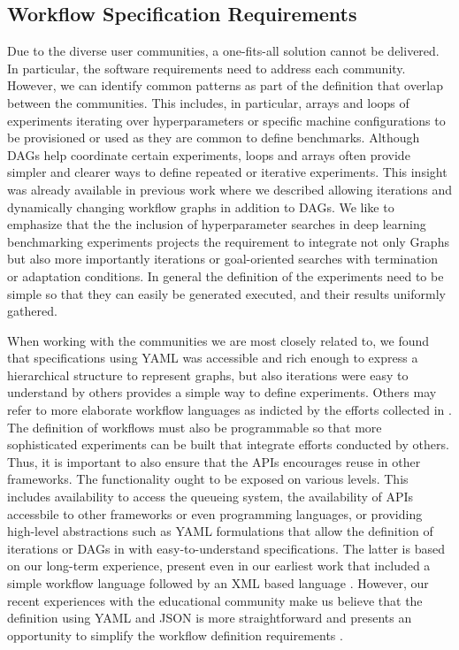 \documentclass[sigconf]{acmart}
\begin{document}
\subsection{Workflow Specification Requirements}
\label{sec:definition}

Due to the diverse user communities, a one-fits-all solution cannot be delivered. In particular, the software requirements need to address each community. However, we can identify common patterns as part of the definition that overlap between the communities. This includes, in particular, arrays and loops of experiments iterating over hyperparameters or specific machine configurations to be provisioned or used as they are common to define benchmarks. Although DAGs help coordinate certain experiments, loops and arrays often provide simpler and clearer ways to define repeated or iterative experiments. This insight was already available in previous work where we described allowing iterations and dynamically changing workflow graphs \citep{las07-workflow} in addition to DAGs. We like to emphasize that the the inclusion of hyperparameter searches in deep learning benchmarking experiments projects the requirement to integrate not only Graphs but also more importantly iterations or goal-oriented searches with termination or adaptation conditions. 
In general the definition of the experiments need to be simple so that they can easily be generated executed, and their results uniformly gathered. 

When working with the communities we are most closely related to, we found that specifications using YAML was accessible and rich enough to express a hierarchical structure to represent graphs, but also iterations were easy to understand by others provides a simple way to define experiments. Others may refer to more elaborate workflow languages as indicted by the efforts collected in \citep{workflow-list}. The definition of workflows must also be programmable so that more sophisticated experiments can be built that integrate efforts conducted by others. Thus, it is important to also ensure that the APIs encourages reuse in other frameworks. The functionality ought to be exposed on various levels. This includes availability to access the queueing system, the availability of APIs accessbile to other frameworks or even programming languages, or providing high-level abstractions such as YAML formulations that allow the definition of iterations or DAGs in with easy-to-understand specifications. The latter is based on our long-term experience, present even in our earliest work that included a simple workflow language \citep{las-96-ecwmf} followed by an XML based language \citep{las07-workflow}. However, our recent experiences with the educational community make us believe that the definition using YAML and JSON is more straightforward and presents an opportunity to simplify the workflow definition requirements \citep{cloudmesh-cc,cloudmesh-ee}.
\end{document}
